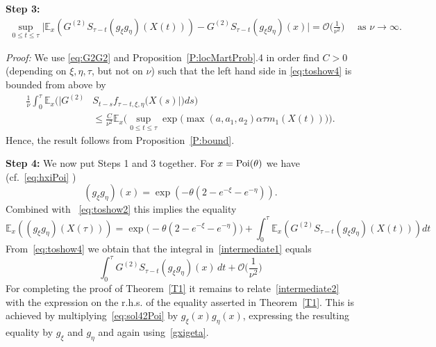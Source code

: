 \documentclass{imsart}
\theoremstyle{plain}
\theoremstyle{definition}
\begin{document}
\noindent\textbf{Step 3:} 
\begin{align}
\label{eq:toshow4}
 \sup_{0 \leq t \leq\tau} \Big| \mathbb E_x\left(G^{(2)}S_{\tau-t} (g_\xi g_\eta)(X(t))\right) - G^{(2)}S_{\tau-t} (g_\xi g_\eta)(x) \Big| = \mathcal O \Big( \frac 1{\nu^2}\Big) \quad \mbox{ as } \nu \to \infty.
\end{align}

\noindent
{\em Proof:} We use \eqref{eq:G2G2} and Proposition~\ref{P:locMartProb}.4 in order find $C>0$ (depending on $\xi, \eta, \tau$, but not on $\nu$) such that the left hand side in \eqref{eq:toshow4} is bounded from above by  
\begin{align*}
    \frac 1 \nu \int_0^\tau \mathbb E_x \Big(\Big|G^{(2)} & S_{t-s} f_{\tau-t, \xi, \eta}(X(s)\Big|\Big)ds \Big) \\ & \leq \frac{C}{\nu^2} \mathbb E_x\Big(\sup_{0\leq t\leq \tau} \exp\big(\max(a, a_1, a_2) \alpha \tau m_1(X(t)) \big) \Big).
\end{align*}
Hence, the result follows from Proposition~\ref{P:bound}.

\noindent\textbf{Step 4:}  We now put Steps 1 and 3 together. For $x= {\rm Poi} (\theta)$ we have (cf.~\eqref{eq:hxiPoi} )
\begin{equation}\label{gxigeta}
    (g_\xi g_\eta)(x) = \exp(-\theta(2-e^{-\xi}-e^{-\eta})).
\end{equation}
Combined with ~\eqref{eq:toshow2} this implies the equality 
\begin{equation}\label{intermediate1}
\mathbb E_x((g_\xi g_\eta)(X(\tau))) =  \exp\Big( -\theta(2 - e^{-\xi} - e^{-\eta})\Big) + \int_0^\tau \mathbb E_x\left(G^{(2)} S_{\tau-t}(g_\xi g_\eta) (X(t))\right) dt
\end{equation}
From~\eqref{eq:toshow4} we obtain that the integral in~\eqref{intermediate1} equals
\begin{equation}\label{intermediate2}
\int_0^\tau G^{(2)}S_{\tau-t}(g_\xi g_\eta)(x)\, dt + \mathcal O\bigg(\frac 1{\nu^2}\bigg)
\end{equation}
For completing the proof of Theorem~\ref{T1} it remains to relate~\eqref{intermediate2} with the expression on the r.h.s. of the equality asserted in Theorem~\ref{T1}. This is achieved by multiplying~\eqref{eq:sol42Poi} by $g_{\xi}(x)g_{\eta}(x)$, expressing the resulting equality by $g_\xi$ and $g_\eta$ and again using~\eqref{gxigeta}. 
\end{document}
